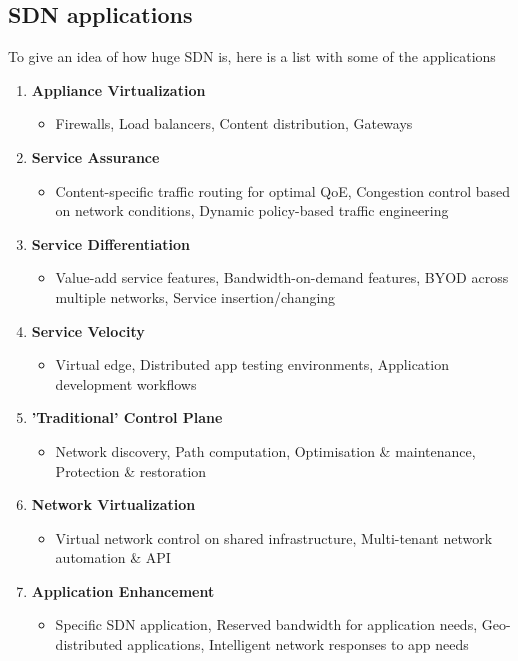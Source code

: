 \subsection{SDN applications}

To give an idea of how huge SDN is, here is a list with some of the applications 

\begin{enumerate}
\item \textbf{Appliance Virtualization}
	\begin{itemize}
	\item Firewalls, Load balancers, Content distribution, Gateways
	\end{itemize}
\item \textbf{Service Assurance}
	\begin{itemize}
	\item Content-specific traffic routing for optimal QoE, Congestion control based on network conditions, Dynamic policy-based traffic engineering 
	\end{itemize}
\item \textbf{Service Differentiation}
	\begin{itemize}
	\item Value-add service features, Bandwidth-on-demand features, BYOD across multiple networks, Service insertion/changing
	\end{itemize}
\item \textbf{Service Velocity}
	\begin{itemize}
	\item Virtual edge, Distributed app testing environments, Application development workflows 
	\end{itemize}
\item \textbf{'Traditional' Control Plane}
	\begin{itemize}
	\item Network discovery, Path computation, Optimisation \& maintenance, Protection \& restoration
	\end{itemize}
\item \textbf{Network Virtualization}
	\begin{itemize}
	\item Virtual network control on shared infrastructure, Multi-tenant network automation \& API
	\end{itemize}
\item \textbf{Application Enhancement}
	\begin{itemize}
	\item Specific SDN application, Reserved bandwidth for application needs, Geo-distributed applications, Intelligent network responses to app needs
	\end{itemize}
\end{enumerate}


